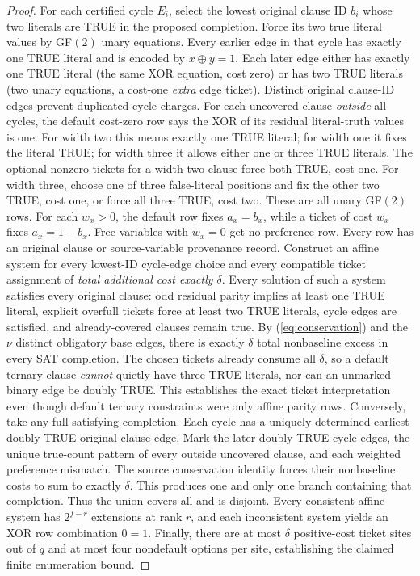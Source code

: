 \documentclass[11pt]{article}
\begin{document}
\begin{proof}
For each certified cycle $E_i$, select the lowest original clause ID $b_i$ whose two literals are TRUE in the proposed completion. Force its two true literal values by GF$(2)$ unary equations. Every earlier edge in that cycle has exactly one TRUE literal and is encoded by $x\oplus y=1$. Each later edge either has exactly one TRUE literal (the same XOR equation, cost zero) or has two TRUE literals (two unary equations, a cost-one \emph{extra} edge ticket). Distinct original clause-ID edges prevent duplicated cycle charges.
For each uncovered clause \emph{outside} all cycles, the default cost-zero row says the XOR of its residual literal-truth values is one. For width two this means exactly one TRUE literal; for width one it fixes the literal TRUE; for width three it allows either one or three TRUE literals. The optional nonzero tickets for a width-two clause force both TRUE, cost one. For width three, choose one of three false-literal positions and fix the other two TRUE, cost one, or force all three TRUE, cost two. These are all unary GF$(2)$ rows. For each $w_x>0$, the default row fixes $a_x=b_x$, while a ticket of cost $w_x$ fixes $a_x=1-b_x$. Free variables with $w_x=0$ get no preference row. Every row has an original clause or source-variable provenance record.
Construct an affine system for every lowest-ID cycle-edge choice and every compatible ticket assignment of \emph{total additional cost exactly $\delta$}. Every solution of such a system satisfies every original clause: odd residual parity implies at least one TRUE literal, explicit overfull tickets force at least two TRUE literals, cycle edges are satisfied, and already-covered clauses remain true. By (\ref{eq:conservation}) and the $\nu$ distinct obligatory base edges, there is exactly $\delta$ total nonbaseline excess in every SAT completion. The chosen tickets already consume all $\delta$, so a default ternary clause \emph{cannot} quietly have three TRUE literals, nor can an unmarked binary edge be doubly TRUE. This establishes the exact ticket interpretation even though default ternary constraints were only affine parity rows.
Conversely, take any full satisfying completion. Each cycle has a uniquely determined earliest doubly TRUE original clause edge. Mark the later doubly TRUE cycle edges, the unique true-count pattern of every outside uncovered clause, and each weighted preference mismatch. The source conservation identity forces their nonbaseline costs to sum to exactly $\delta$. This produces one and only one branch containing that completion. Thus the union covers all and is disjoint. Every consistent affine system has $2^{f-r}$ extensions at rank $r$, and each inconsistent system yields an XOR row combination $0=1$. Finally, there are at most $\delta$ positive-cost ticket sites out of $q$ and at most four nondefault options per site, establishing the claimed finite enumeration bound.
\end{proof}
\end{document}
